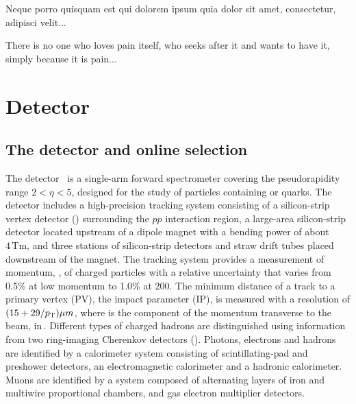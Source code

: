 \begin{savequote}[8cm]
\textlatin{Neque porro quisquam est qui dolorem ipsum quia dolor sit amet, consectetur, adipisci velit...}

There is no one who loves pain itself, who seeks after it and wants to have it, simply because it is pain...
\end{savequote}

\chapter{\label{ch:3-detector}Detector} 

\minitoc

\section{The \lhcb detector and online selection}
\label{sec:detector}

The \lhcb detector~\cite{Alves:2008zz,LHCb-DP-2014-002} is a single-arm forward spectrometer covering the \mbox{pseudorapidity} range $2<\eta <5$, designed for the study of particles containing \bquark or \cquark quarks. The detector includes a high-precision tracking system consisting of a silicon-strip vertex detector (\velo) surrounding the $pp$ interaction region, a large-area silicon-strip detector located upstream of a dipole magnet with a bending power of about $4{\mathrm{\,Tm}}$, and three stations of silicon-strip detectors and straw drift tubes placed downstream of the magnet. The tracking system provides a measurement of momentum, \ptot, of charged particles with a relative uncertainty that varies from 0.5\% at low momentum to 1.0\% at 200\gevc. The minimum distance of a track to a primary vertex (PV), the impact parameter (IP), is measured with a resolution of $(15+29/\mbox{$p_{\mathrm{ T}}$})\mu m$, where \pt is the component of the momentum transverse to the beam, in\,\gevc. Different types of charged hadrons are distinguished using information from two ring-imaging Cherenkov detectors (\rich). Photons, electrons and hadrons are identified by a calorimeter system consisting of scintillating-pad and preshower detectors, an electromagnetic calorimeter and a hadronic calorimeter. Muons are identified by a system composed of alternating layers of iron and multiwire proportional chambers, and gas electron multiplier detectors. 

